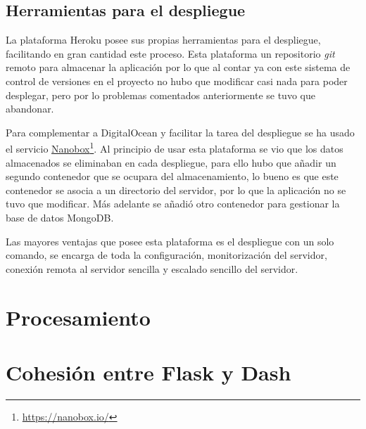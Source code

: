 \subsection{Herramientas para el despliegue}

La plataforma Heroku posee sus propias herramientas para el despliegue, facilitando en gran cantidad este proceso. Esta plataforma un repositorio \textit{git} remoto para almacenar la aplicación por lo que al contar ya con este sistema de control de versiones en el proyecto no hubo que modificar casi nada para poder desplegar, pero por lo problemas comentados anteriormente se tuvo que abandonar.

Para complementar a DigitalOcean y facilitar la tarea del despliegue se ha usado el servicio \href{https://nanobox.io/}{Nanobox}\footnote{\url{https://nanobox.io/}}. Al principio de usar esta plataforma se vio que los datos almacenados se eliminaban en cada despliegue, para ello hubo que añadir un segundo contenedor que se ocupara del almacenamiento, lo bueno es que este contenedor se asocia a un directorio del servidor, por lo que la aplicación no se tuvo que modificar. Más adelante se añadió otro contenedor para gestionar la base de datos MongoDB.

Las mayores ventajas que posee esta plataforma es el despliegue con un solo comando, se encarga de toda la configuración, monitorización del servidor, conexión remota al servidor sencilla y escalado sencillo del servidor.

\section{Procesamiento}

\section{Cohesión entre Flask y Dash}



